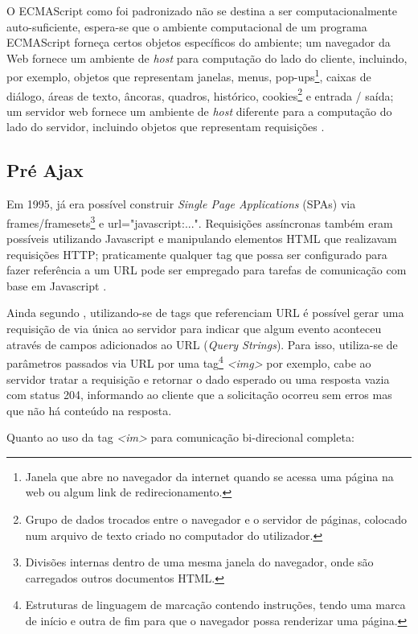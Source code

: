 O ECMAScript como foi padronizado não se destina a ser computacionalmente auto-suficiente, espera-se que o ambiente computacional de um programa ECMAScript forneça certos objetos específicos do ambiente; um navegador da Web fornece um ambiente de \emph{host} para computação do lado do cliente, incluindo, por exemplo, objetos que representam janelas, menus, pop-ups\footnote{Janela que abre no navegador da internet quando se acessa uma página na web ou algum link de redirecionamento.}, caixas de diálogo, áreas de texto, âncoras, quadros, histórico, cookies\footnote{Grupo de dados trocados entre o navegador e o servidor de páginas, colocado num arquivo de texto criado no computador do utilizador.} e entrada / saída; um servidor web fornece um ambiente de \emph{host} diferente para a computação do lado do servidor, incluindo objetos que representam requisições \cite{ecmascript2016}.

\subsection{Pré Ajax}

Em 1995, já era possível construir \emph{Single Page Applications} (SPAs) via frames/framesets\footnote{Divisões internas dentro de uma mesma janela do navegador, onde são carregados outros documentos HTML.} e url="javascript:...". Requisições assíncronas também eram possíveis utilizando Javascript e manipulando elementos HTML que realizavam requisições HTTP; praticamente qualquer tag que possa ser configurado para fazer referência a um URL pode ser empregado para tarefas de comunicação com base em Javascript \cite{powell2008ajax}.

Ainda segundo , utilizando-se de tags que referenciam URL é possível gerar uma requisição de via única ao servidor para indicar que algum evento aconteceu através de campos adicionados ao URL (\emph{Query Strings}). Para isso, utiliza-se de parâmetros passados via URL por uma tag\footnote{Estruturas de linguagem de marcação contendo instruções, tendo uma marca de início e outra de fim para que o navegador possa renderizar uma página.} \emph{<img>} por exemplo, cabe ao servidor tratar a requisição e retornar o dado esperado ou uma resposta vazia com status 204, informando ao cliente que a solicitação ocorreu sem erros mas que não há conteúdo na resposta.

Quanto ao uso da tag \emph{<im>} para comunicação bi-direcional  completa:

